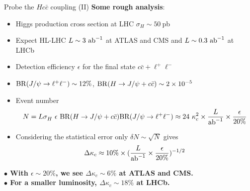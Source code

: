 \documentclass[aspectratio=169]{beamer}
\begin{document}
\begin{frame}{Probe the $Hc{\bar c}$ coupling (II)}
	\hspace{3mm}\textcolor{PittRoyal}{\bf Some rough analysis}:
	\begin{itemize}
		\item Higgs production cross section at LHC $\sigma_H\sim 50~$pb
		\item Expect HL-LHC $L\sim 3~{\rm ab}^{-1}$ at ATLAS and CMS and $L\sim 0.3~{\rm ab}^{-1}$ at LHCb
		\item Detection efficiency $\epsilon$ for the final state $c\bar{c} +\ell^+\ell^-$
		\item ${\rm BR}(J/\psi\to\ell^+\ell^-)\sim 12\%$, ${\rm BR}(H\to J/\psi+c\bar{c})\sim 2\times 10^{-5}$
		\item Event number
		\begin{eqnarray}
			N = L \sigma_H^{}\ \epsilon\ {\rm BR}(H\to J/\psi+c\bar{c}) {\rm BR}(J/\psi\to\ell^+\ell^-) \approx 24\ \kappa_c^2 \times {L\over {\rm ab}^{-1}}\times {\epsilon \over 20\%}\nonumber
		\end{eqnarray}
		\item Considering the statistical error only $\delta N\sim \sqrt{N}$ gives
		\begin{eqnarray}
			\Delta\kappa_c \approx 10\% \times ({L\over {\rm ab}^{-1}}\times {\epsilon \over 20\%})^{-1/2} \nonumber
		\end{eqnarray}
	\end{itemize}
	\vspace{3mm}\hspace{5mm}\textcolor{PittRoyal}{\bf $\bullet$ With $\epsilon\sim 20\%$, we see $\Delta \kappa_c \sim 6\%$ at ATLAS and CMS.}\\
	\vspace{2mm}\hspace{5mm}\textcolor{PittRoyal}{\bf $\bullet$ For a smaller luminosity, $\Delta \kappa_c \sim 18\%$ at LHCb.}
\end{frame}


\end{document}
